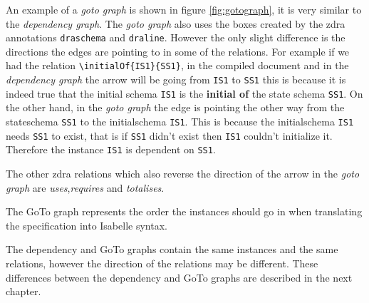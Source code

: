 An example of a \emph{goto graph} is shown in figure \ref{fig:gotograph}, it is
very similar to the \emph{dependency graph}. The \emph{goto graph} also uses the
boxes created by the \gls{zdra} annotations \verb|draschema| and \verb|draline|.
However the only slight difference is the directions the edges are pointing to
in some of the relations. For example if we had the relation
\verb|\initialOf{IS1}{SS1}|, in the compiled document and in the
\emph{dependency graph} the arrow will be going from \verb|IS1| to \verb|SS1|
this is because it is indeed true that the initial schema \verb|IS1| is the
\textbf{initial of} the state schema \verb|SS1|. On the other hand, in the
\emph{goto graph} the edge is pointing the other way from the stateschema
\verb|SS1| to the initialschema \verb|IS1|. This is because the initialschema
\verb|IS1| needs \verb|SS1| to exist, that is if \verb|SS1| didn't exist then
\verb|IS1| couldn't initialize it. Therefore the instance \verb|IS1| is dependent
on \verb|SS1|.

The other \gls{zdra} relations which also reverse the direction of the arrow in
the \emph{goto graph} are \emph{uses},\emph{requires} and \emph{totalises}.

The GoTo graph represents the order the instances should go in when translating
the specification into Isabelle syntax.

The dependency and GoTo graphs contain the same instances and the same
relations, however  the direction of the relations may be different. These differences between the dependency and GoTo graphs are
described in the next chapter.




